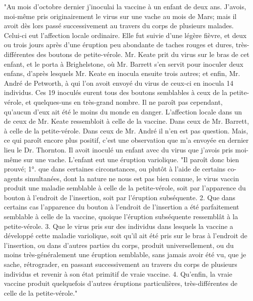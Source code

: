 "Au mois d'octobre dernier j'inoculai la vaccine à un enfant de deux ans. J'avois, moi-même pris originairement le virus sur une vache au mois de Mars; mais il avoit dès lors passé successivement au travers du corps de plusieurs malades. Celui-ci eut l'affection locale ordinaire. Elle fut suivie d'une légère fièvre, et deux ou trois jours après d'une éruption peu abondante de taches rouges\setcounter{page}{260} et dures, très-différentes des boutons de petite-vérole. Mr. Keate prit du virus sur le bras de cet enfant, et le porta à Brighelstone, où Mr. Barrett s'en servit pour inoculer deux enfans, d'après lesquels Mr. Keate en inocula ensuite trois autres; et enfin, Mr. André de Petworth, à qui l'on avoit envoyé du virus de ceux-ci en inocula 14 individus. Ces 19 inoculés eurent tous des boutons semblables à ceux de la petite-vérole, et quelques-uns en très-grand nombre. Il ne paroît pas cependant, qu'aucun d'eux ait été le moins du monde en danger. L'affection locale dans un de ceux de Mr. Keate ressembloit à celle de la vaccine. Dans ceux de Mr. Barrett, à celle de la petite-vérole. Dans ceux de Mr. André il n'en est pas question. Mais, ce qui paroît encore plus positif, c'est une observation que m'a envoyée en dernier lieu le Dr. Thornton. Il avoit inoculé un enfant avec du virus que j'avois pris moi-même sur une vache. L'enfant eut une éruption variolique.
"Il paroît donc bien prouvé; 1°. que dans certaines circonstances, ou plutôt à l'aide de certains co-agents simultanées, dont la nature ne nous est pas bien connue, le virus vaccin produit une maladie semblable à celle de la petite-vérole, soit par l'apparence du bouton à l'endroit de l'insertion, soit par l'éruption\setcounter{page}{261} subséquente. 2. Que dans certains cas l'apparence du bouton à l'endroit de l'insertion a été parfaitement semblable à celle de la vaccine, quoique l'éruption subséquente ressemblât à la petite-vérole. 3. Que le virus pris sur des individus dans lesquels la vaccine a développé cette maladie variolique, soit qu'il ait été pris sur le bras à l'endroit de l'insertion, ou dans d'autres parties du corps, produit universellement, ou du moins très-généralement une éruption semblable, sans jamais avoir été vu, que je sache, rétrograder, en passant successivement au travers du corps de plusieurs individus et revenir à son état primitif de vraie vaccine. 4. Qu'enfin, la vraie vaccine produit quelquefois d'autres éruptions particulières, très-différentes de celle de la petite-vérole."
